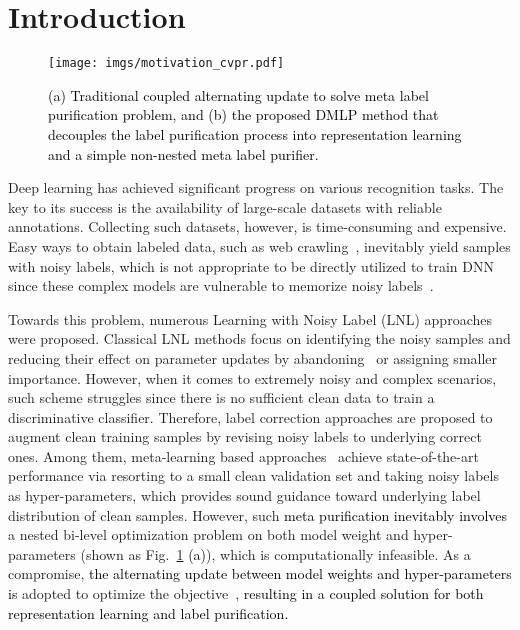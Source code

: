 \documentclass[10pt,twocolumn,letterpaper]{article}
\newcommand{\zbs}[1]{\textcolor{black}{#1}}
\newcommand{\lyx}[1]{\textcolor{black}{#1}}
\newcommand{\leone}[1]{\textcolor{black}{#1}}
\begin{document}
\section{Introduction}

\begin{figure}[!t]
\centering
\texttt{[image: imgs/motivation\_cvpr.pdf]}
\vspace{-0.8em}
\caption{ \leone{(a) \lyx{Traditional coupled alternating update to solve meta label purification problem}, and (b) the proposed DMLP method that decouples the \zbs{label purification} process into representation learning and a simple non-nested meta label purifier.}}
\vspace{-0.4em}
\label{fig:concept}

\end{figure}
Deep learning has achieved significant progress on various recognition tasks. The key to its success is the availability of large-scale datasets with reliable annotations. Collecting such datasets, however, is time-consuming and expensive. Easy ways to obtain labeled data, such as web crawling~\cite{Clothing1M}, inevitably yield samples with noisy labels, which is not appropriate to be directly utilized to train DNN since these complex models {are vulnerable to} memorize noisy labels~\cite{memorizationEffect}.

Towards this problem, numerous Learning with Noisy Label (LNL) approaches were proposed. Classical LNL methods focus on identifying the noisy samples and reducing their {effect on parameter updates by} abandoning~\cite{Co-han2018co} or assigning smaller importance. However, when it comes to extremely {noisy and complex scenarios, such scheme struggles since there is no sufficient clean data to train a discriminative classifier.} {Therefore}, label correction approaches {are proposed to augment clean training samples by revising} noisy labels to underlying {correct} ones. Among them, meta-learning based approaches~\cite{Learning-to-Reweight,MLNT,AAAI-2021-meta} achieve state-of-the-art performance via resorting to a small clean validation set {and taking noisy labels as hyper-parameters}, which provides sound guidance {toward} underlying label distribution of clean samples. However, {such \lyx{meta purification inevitably involves} a nested bi-level optimization problem on both model weight and hyper-parameters (shown as Fig.~\ref{fig:concept} \leone{(a)}), which is computationally infeasible. As a compromise, \lyx{the alternating update between model weights and hyper-parameters is} adopted to optimize the objective~\cite{Learning-to-Reweight,MLNT,AAAI-2021-meta},  \lyx{resulting in a coupled solution for both representation learning and label purification.}}
\end{document}
